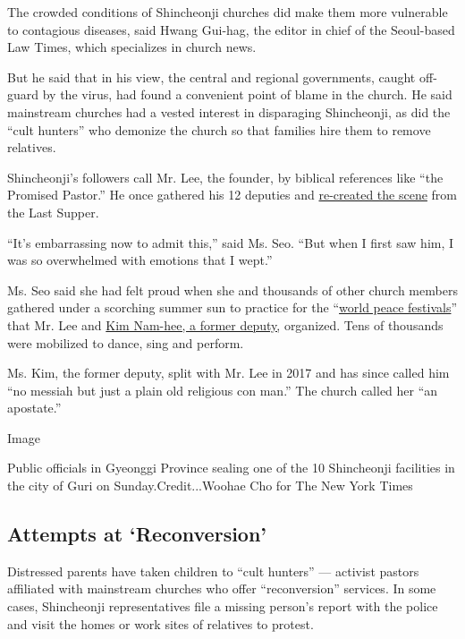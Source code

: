 The crowded conditions of Shincheonji churches did make them more
vulnerable to contagious diseases, said Hwang Gui-hag, the editor in
chief of the Seoul-based Law Times, which specializes in church news.

But he said that in his view, the central and regional governments,
caught off-guard by the virus, had found a convenient point of blame in
the church. He said mainstream churches had a vested interest in
disparaging Shincheonji, as did the ``cult hunters'' who demonize the
church so that families hire them to remove relatives.

Shincheonji's followers call ​Mr. ​Lee, the founder, by biblical
references like ``the Promised Pastor​.'' He once gathered his 12
deputies and
\href{https://blog.naver.com/downwave/150137689704}{re-created the
scene} from the Last Supper.

``It's embarrassing now to admit this,'' said Ms. Seo. ``But when I
first saw him, I was so overwhelmed with emotions that I wept.''

Ms. Seo said she had felt proud when she and thousands of other church
members gathered under a scorching summer sun to practice for the
``​\href{https://www.youtube.com/watch?v=2HqOEyd44wQ}{world ​​​peace
festivals}'' that Mr. Lee and
\href{https://www.youtube.com/watch?v=8Q5xUWfG3bo}{Kim Nam-hee, a former
deputy,} organized. Tens of thousands were mobilized to dance, sing and
perform.

Ms. Kim, the former deputy, split with Mr. Lee in 2017 and has since
called him ``no messiah but just a plain old religious con man.'' The
church called her ``an apostate.''

Image

Public officials in Gyeonggi Province sealing one of the 10 Shincheonji
facilities in the city of Guri on Sunday.Credit...Woohae Cho for The New
York Times

\hypertarget{attempts-at-reconversion}{%
\subsection{Attempts at `Reconversion'}\label{attempts-at-reconversion}}

Distressed parents have taken children to ``cult hunters'' --- activist
pastors affiliated with mainstream churches who offer ``reconversion''
services. In some cases, Shincheonji representatives file a missing
person's report with the police and visit the homes or work sites of
relatives to protest.

